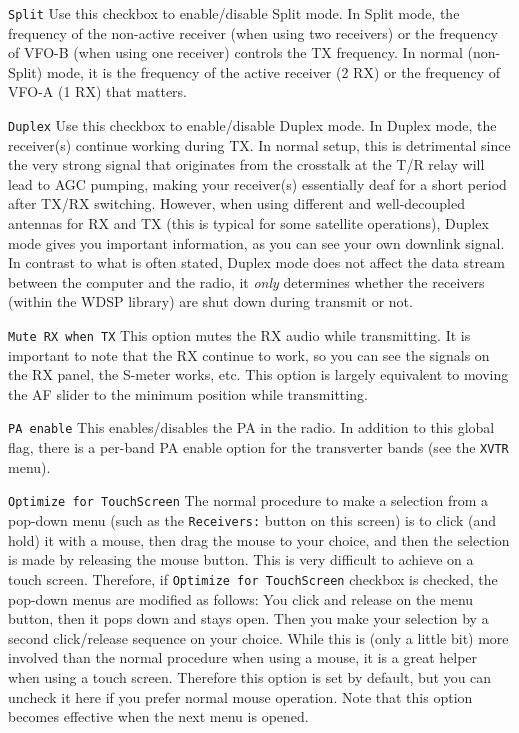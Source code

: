 \documentclass[12pt]{book}
\def\rett#1{\texttt{\color{red}#1}}
\def\bltt#1{\texttt{\color{blue}#1}}
\begin{document}
\rett{Split} Use this checkbox to enable/disable Split mode. In Split mode, the frequency of
the non-active receiver (when using two receivers) or the frequency of VFO-B (when using one
receiver) controls the TX frequency. In normal (non-Split) mode, it is the frequency of
the active receiver (2 RX) or the frequency of VFO-A (1 RX) that matters.

\rett{Duplex} Use this checkbox to enable/disable Duplex mode. In Duplex mode, the receiver(s)
continue working during TX. In normal setup, this is detrimental since the very strong
signal that originates from the crosstalk at the T/R relay will lead to AGC pumping,
making your receiver(s) essentially deaf for a short period after TX/RX switching.
However, when using different and well-decoupled antennas for RX and TX (this is typical
for some satellite operations), Duplex mode gives you important information, as you can
see your own downlink signal. In contrast to what is often stated, Duplex mode does not
affect the data stream between the computer and the radio, it \textit{only} determines
whether the receivers (within the WDSP library) are shut down during transmit or not.

\rett{Mute RX when TX} This option mutes the RX audio while transmitting. It is important
to note that the RX continue to work, so you can see the signals on the RX panel, the
S-meter works, etc. This option is largely equivalent to moving the AF slider to the
minimum position while transmitting.

\rett{PA enable} This enables/disables the PA in the radio. In addition to this global
flag, there is a per-band PA enable option for the transverter bands (see the \bltt{XVTR}
menu).

\rett{Optimize for TouchScreen} The normal procedure to make a selection from a
pop-down menu (such as the \rett{Receivers:} button on this screen) is to click
(and hold) it with a mouse, then drag the mouse to your choice, and then the selection
is made by releasing the mouse button. This is very difficult to achieve on a touch
screen. Therefore, if \rett{Optimize for TouchScreen} checkbox is checked, the pop-down
menus are modified as follows: You click and release on the menu button, then it pops
down and stays open. Then you make your selection by a second click/release sequence
on your choice. While this is (only a little bit) more involved than the normal procedure
when using a mouse, it is a great helper when using a touch screen. Therefore this
option is set by default, but you can uncheck it here if you prefer normal
mouse operation. Note that this option becomes effective when the next menu is opened.
\end{document}
